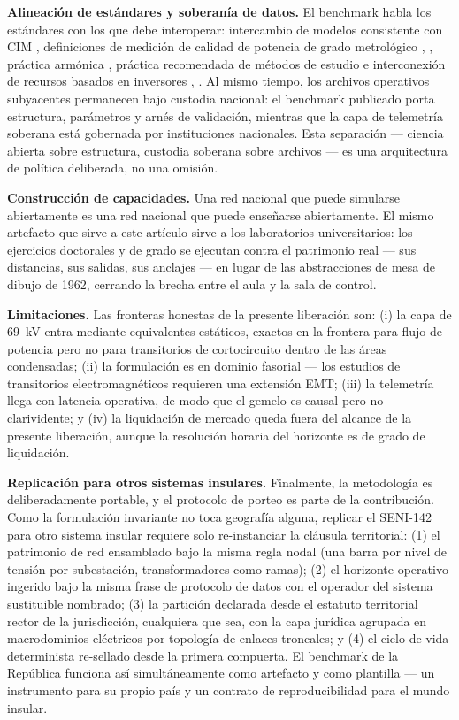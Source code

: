 \textbf{Alineación de estándares y soberanía de datos.} El benchmark habla los estándares con los que debe interoperar: intercambio de modelos consistente con CIM \cite{iec61970}, definiciones de medición de calidad de potencia de grado metrológico \cite{iec61000}, \cite{ieee1459}, práctica armónica \cite{ieee519}, práctica recomendada de métodos de estudio \cite{ieee399} e interconexión de recursos basados en inversores \cite{ieee2800}, \cite{ieee1547}. Al mismo tiempo, los archivos operativos subyacentes permanecen bajo custodia nacional: el benchmark publicado porta estructura, parámetros y arnés de validación, mientras que la capa de telemetría soberana está gobernada por instituciones nacionales. Esta separación --- ciencia abierta sobre estructura, custodia soberana sobre archivos --- es una arquitectura de política deliberada, no una omisión.

\textbf{Construcción de capacidades.} Una red nacional que puede simularse abiertamente es una red nacional que puede enseñarse abiertamente. El mismo artefacto que sirve a este artículo sirve a los laboratorios universitarios: los ejercicios doctorales y de grado se ejecutan contra el patrimonio real --- sus distancias, sus salidas, sus anclajes --- en lugar de las abstracciones de mesa de dibujo de 1962, cerrando la brecha entre el aula y la sala de control.

\textbf{Limitaciones.} Las fronteras honestas de la presente liberación son: (i) la capa de 69~kV entra mediante equivalentes estáticos, exactos en la frontera para flujo de potencia pero no para transitorios de cortocircuito dentro de las áreas condensadas; (ii) la formulación es en dominio fasorial --- los estudios de transitorios electromagnéticos requieren una extensión EMT; (iii) la telemetría llega con latencia operativa, de modo que el gemelo es causal pero no clarividente; y (iv) la liquidación de mercado queda fuera del alcance de la presente liberación, aunque la resolución horaria del horizonte es de grado de liquidación.

\textbf{Replicación para otros sistemas insulares.} Finalmente, la metodología es deliberadamente portable, y el protocolo de porteo es parte de la contribución. Como la formulación invariante no toca geografía alguna, replicar el SENI-142 para otro sistema insular requiere solo re-instanciar la cláusula territorial: (1) el patrimonio de red ensamblado bajo la misma regla nodal (una barra por nivel de tensión por subestación, transformadores como ramas); (2) el horizonte operativo ingerido bajo la misma frase de protocolo de datos con el operador del sistema sustituible nombrado; (3) la partición declarada desde el estatuto territorial rector de la jurisdicción, cualquiera que sea, con la capa jurídica agrupada en macrodominios eléctricos por topología de enlaces troncales; y (4) el ciclo de vida determinista re-sellado desde la primera compuerta. El benchmark de la República funciona así simultáneamente como artefacto y como plantilla --- un instrumento para su propio país y un contrato de reproducibilidad para el mundo insular.
